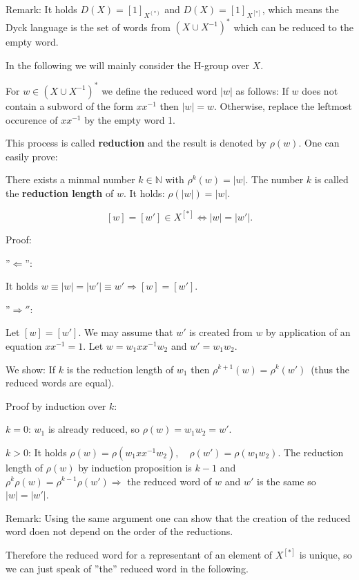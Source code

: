 Remark: It holds $D(X) = [1]_{X^{(*)}}$ and $D(X) = [1]_{X^{[*]}}$, which means
the Dyck language is the set of words from $(X \cup X^{-1})^*$ which can be
reduced to the empty word.

In the following we will mainly consider the H-group over $X$.

For $w \in (X \cup X^{-1})^*$ we define the reduced word $|w|$ as follows: If
$w$ does not contain a subword of the form $x x^{-1}$ then $|w| = w$. Otherwise,
replace the leftmost occurence of $x x^{-1}$ by the empty word 1.

This process is called {\bf reduction} and the result is denoted by $\rho(w)$.
One can easily prove:

\begin{lemma}
There exists a minmal number $k \in \mathbb{N}$ with $\rho^k(w) = |w|$. The
number $k$ is called the {\bf reduction length} of $w$. It holds: $\rho(|w|) =
|w|$.
\end{lemma}

\begin{lemma}
\[ [w] = [w'] \in X^{[*]} \Leftrightarrow |w| = |w'|. \]
\end{lemma}

Proof: 

''$\Leftarrow$'':

It holds $w \equiv |w| = |w'| \equiv w' \Rightarrow [w] = [w']$.

''$\Rightarrow''$:

Let $[w] = [w']$. We may assume that $w'$ is created from $w$ by application of
an equation $x x^{-1} = 1$. Let $w = w_1 x x^{-1} w_2$ and $w' = w_1 w_2$.

We show: If $k$ is the reduction length of $w_1$ then $\rho^{k+1}(w) =
\rho^k(w')$\ (thus the reduced words are equal).

Proof by induction over $k$:

$k = 0$: $w_1$ is already reduced, so $\rho(w) = w_1 w_2 = w'$.

$k > 0$: It holds $\rho(w) = \rho(w_1 x x^{-1} w_2), \quad \rho(w') = \rho(w_1
w_2)$. The reduction length of $\rho(w)$ by induction proposition is $k-1$ and
$\rho^k \rho(w) = \rho^{k-1}\rho(w') \Rightarrow$ the reduced word of $w$ and
$w'$ is the same so $|w| = |w'|$.

Remark: Using the same argument one can show that the creation of the reduced
word doen not depend on the order of the reductions.

Therefore the reduced word for a representant of an element of $X^[*]$ is
unique, so we can just speak of ''the'' reduced word in the following.

